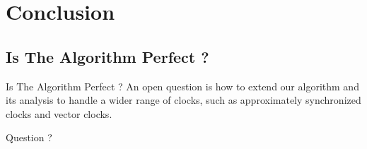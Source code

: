 \documentclass{beamer}
\begin{document}
\section{Conclusion}
\subsection{Is The Algorithm Perfect ?}
\begin{frame}{Is The Algorithm Perfect ?}
 An open question is how to extend our algorithm and its analysis to handle a wider range of clocks, such as approximately synchronized clocks and vector clocks.
\end{frame}

\begin{frame}{Question ?}
	
\end{frame}
\end{document}
